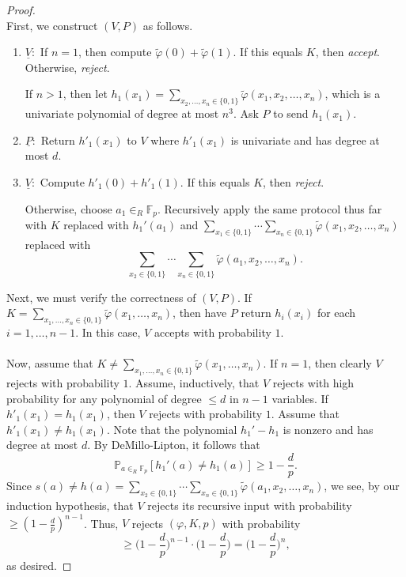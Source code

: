 \documentclass[10pt,letterpaper,cm]{nupset}
\theoremstyle{definition}
\newcommand{\F}{\mathbb F}
\newcommand{\1}{\mathbf{1}}
\newcommand{\0}{\vec 0}
\begin{document}
\begin{proof} $ $
\\First, we construct $(V, P)$ as follows. 
\begin{enumerate}
\item $\underline{V}:$ If $n=1$, then compute $\tilde{\varphi}(0) + \tilde{\varphi}(1)$. If this equals $K$, then \textit{accept}. Otherwise, \textit{reject}. 

If $n>1$, then let $h_1(x_1) = \sum_{x_2, \ldots, x_n \in \{0,1\}} \tilde{\varphi}(x_1, x_2, \ldots, x_n)$, which is a univariate polynomial of degree at most $n^3$. Ask $P$ to send $h_1(x_1)$. 
\item $\underline{P}:$ Return  $h'_1(x_1)$ to $V$ where $h'_1(x_1)$ is univariate and has degree at most $d$. 
\item $\underline{V}:$ Compute $h'_1(0) + h'_1(1)$. If this equals $K$, then \textit{reject}. 

Otherwise,  choose $a_1 \in_R \F_p$. Recursively apply the same protocol thus far with $K$ replaced with $h_1'(a_1)$ and $ \sum_{x_1 \in \{0,1\}} \cdots \sum_{x_n \in \{0,1\}} \tilde{\varphi}(x_1, x_2, \ldots, x_n)$ replaced with $$\sum_{x_2 \in \{0,1\}} \cdots \sum_{x_n \in \{0,1\}} \tilde{\varphi}(a_1, x_2, \ldots, x_n).$$
\end{enumerate}
Next, we must verify the correctness of $(V,P)$. If $K = \sum_{x_1, \ldots, x_n \in \{0,1\}} \tilde{\varphi}(x_1, \ldots, x_n)$, then have $P$ return $h_i(x_i)$ for each $i=1, \ldots, {n-1}$. In this case, $V$ accepts with probability $1$. 
\\ \\ Now, assume that $K \ne \sum_{x_1, \ldots, x_n \in \{0,1\}} \tilde{\varphi}(x_1, \ldots, x_n)$.  If $n=1$, then clearly $V$ rejects with probability $1$. Assume, inductively, that $V$ rejects with high probability for any polynomial of degree $\leq d$ in $n-1$ variables. If $h'_1(x_1) = h_1(x_1)$, then $V$ rejects with probability $1$. Assume that $h'_1(x_1) \ne h_1(x_1)$.  Note that the polynomial $h_1' - h_1$ is nonzero and has degree at most $d$.  By DeMillo-Lipton, it follows that  $$\mathbb{P}_{a \in_R \F_p} [h_1'(a) \ne h_1(a)] \geq 1- \frac{d}{p}.$$ Since $s(a) \ne h(a) = \sum_{x_2 \in \{0,1\}} \cdots \sum_{x_n \in \{0,1\}} \tilde{\varphi}(a_1, x_2, \ldots, x_n)$, we see, by our induction hypothesis, that $V$ rejects its recursive input with probability $\geq (1-\frac{d}{p})^{n-1}$. Thus, $V$ rejects $(\varphi, K, p)$ with probability $$ \geq \big (1-\frac{d}{p}\big )^{n-1} \cdot \big (1-\frac{d}{p}\big ) = \big (1-\frac{d}{p}\big )^{n},$$ as desired.
\end{proof}
\end{document}

